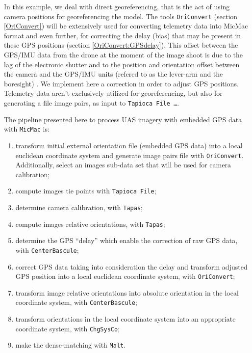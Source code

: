 In this example, we deal with direct georeferencing, that is the act of using camera positions for georeferencing the model. The tools {\tt OriConvert} (section \ref{OriConvert}) will be extensively used for converting telemetry data into MicMac format and even further, for correcting the delay (bias) that may be present in these GPS positions (section \ref{OriConvert:GPSdelay}). This offset between the GPS/IMU data from the drone at the moment of the image shoot is due to the lag of the electronic shutter and to the position and orientation offset between the camera and the GPS/IMU units (refered to as the lever-arm and the boresight) . We implement here a correction  in order to adjust GPS positions. Telemetry data aren't exclusively utilized for georeferencing, but also for generating a file image pairs, as input to {\tt Tapioca File \dots }. 


\vspace{\baselineskip}
The pipeline presented here to process UAS imagery with embedded GPS data with {\tt MicMac} is:
\begin{enumerate}
\item transform initial external orientation file (embedded GPS data) into a local euclidean coordinate system and generate image pairs file with {\tt OriConvert}. Additionally, select an images sub-data set that will be used for camera calibration;
\item compute images tie points with {\tt Tapioca File};
\item determine camera calibration, with {\tt Tapas};
\item compute images relative orientations, with {\tt Tapas};
\item determine the GPS ``delay'' which enable the correction of raw GPS data, with {\tt CenterBascule};
\item correct GPS data taking into consideration the delay and transform adjusted GPS position into a local euclidean coordinate system, with {\tt OriConvert};
\item transform image relative orientations into absolute orientation in the local coordinate system, with {\tt CenterBascule};
\item transform orientations in the local coordinate system into an appropriate coordinate system, with {\tt ChgSysCo};
\item make the dense-matching with {\tt Malt}.
\end{enumerate}
\vspace{\baselineskip}

